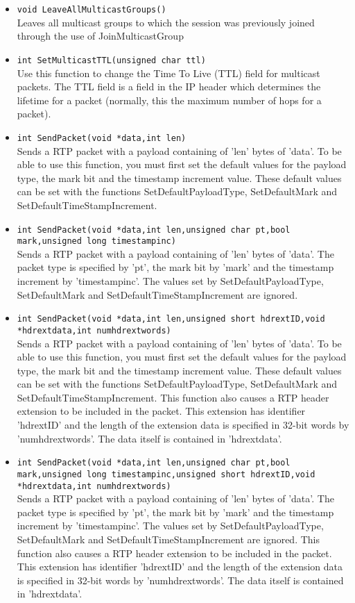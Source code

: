 \begin{itemize}
\item {\tt void LeaveAllMulticastGroups()}\\
 	Leaves all multicast groups to which the session was previously joined
 	through the use of JoinMulticastGroup
 	
\item {\tt int SetMulticastTTL(unsigned char ttl)}\\
 	Use this function to change the Time To Live (TTL) field for multicast
 	packets. The TTL field is a field in the IP header which determines
 	the lifetime for a packet (normally, this the maximum number of hops
 	for a packet).
	
\item {\tt int SendPacket(void *data,int len)}\\
	Sends a RTP packet with a payload containing of 'len' bytes of
	'data'. To be able to use this function, you must first set the
	default values for the payload type, the mark bit and the timestamp
	increment value. These default values can be set with the functions
	SetDefaultPayloadType, SetDefaultMark and SetDefaultTimeStampIncrement.

\item {\tt int SendPacket(void *data,int len,unsigned char pt,bool mark,unsigned long timestampinc)}\\
	Sends a RTP packet with a payload containing of 'len' bytes of
	'data'. The packet type is specified by 'pt', the mark bit by 'mark'
	and the timestamp increment by 'timestampinc'. The values set by
	SetDefaultPayloadType, SetDefaultMark and SetDefaultTimeStampIncrement
	are ignored.
	
\item {\tt int SendPacket(void *data,int len,unsigned short hdrextID,void *hdrextdata,int numhdrextwords)}\\
	Sends a RTP packet with a payload containing of 'len' bytes of
	'data'. To be able to use this function, you must first set the
	default values for the payload type, the mark bit and the timestamp
	increment value. These default values can be set with the functions
	SetDefaultPayloadType, SetDefaultMark and SetDefaultTimeStampIncrement.
	This function also causes a RTP header extension to be included in the
	packet. This extension has identifier 'hdrextID' and the length of the
	extension data is specified in 32-bit words by 'numhdrextwords'. The
	data itself is contained in 'hdrextdata'.

\item {\tt int SendPacket(void *data,int len,unsigned char pt,bool mark,unsigned long timestampinc,unsigned short hdrextID,void *hdrextdata,int numhdrextwords)}\\
	Sends a RTP packet with a payload containing of 'len' bytes of
	'data'. The packet type is specified by 'pt', the mark bit by 'mark'
	and the timestamp increment by 'timestampinc'. The values set by
	SetDefaultPayloadType, SetDefaultMark and SetDefaultTimeStampIncrement
	are ignored. This function also causes a RTP header extension to be
	included in the packet. This extension has identifier 'hdrextID' and
	the length of the extension data is specified in 32-bit words by
	'numhdrextwords'. The data itself is contained in 'hdrextdata'.


\end{itemize}
